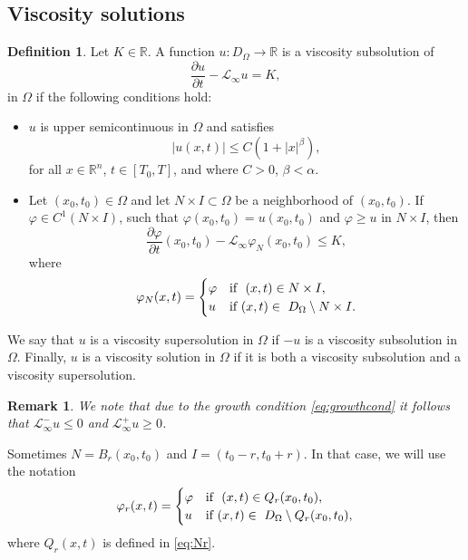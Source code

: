 \documentclass[11pt]{article}
\newcommand{\R}{\mathbb{R}}
\providecommand{\Linf}{\mathcal{L}_{\infty}}
\providecommand{\Lpos}{\mathcal{L}_{\infty}^+}
\providecommand{\Lneg}{\mathcal{L}_{\infty}^-}
\providecommand{\Rn}{\mathbb{R}^n}
\providecommand{\Ns}{N \times I}
\providecommand{\Rnp}{D_{\Omega}}
\newtheorem{rmk}[thm]{Remark}
\numberwithin{equation}{section}
\theoremstyle{definition}
\newtheorem{definition}[thm]{Definition}
\begin{document}
\subsection{Viscosity solutions}\label{sec:viscositysol}
\begin{definition}\label{def:viscsol}
    Let $K \in \R$. A function  $u: \Rnp \to \R$ is a viscosity subsolution of 
    \begin{equation}\label{eq:viscsol}
        \frac{\partial u}{\partial t}-\Linf u = K,
    \end{equation}
    in $\Omega$ if the following conditions hold:
    \begin{itemize}
        \item $u$ is upper semicontinuous in $\Omega$ and satisfies
    \begin{equation}\label{eq:growthcond}
          |u(x,t)| \leq C(1+|x|^{\beta}),  
    \end{equation}
         for all $x \in \Rn$, $t\in [T_0,T]$, and where $C> 0$, $\beta < \alpha$. 
        \item Let $(x_0,t_0) \in \Omega$ and let $\Ns \subset \Omega $ be a neighborhood of $(x_0,t_0)$. If $\varphi \in C^1(\Ns)$, such that $\varphi(x_0,t_0)=u(x_0,t_0)$ and $\varphi \geq u$ in $\Ns$, then
    $$
    \frac{\partial \varphi}{\partial t} \left(x_0,t_0\right)  - \mathcal{L}_{\infty}\varphi_{N}(x_0,t_0) \leq K, 
    $$
    where
\begin{align}\label{eq:varphiN}
     \varphi_{N}(x,t)= \begin{cases}
                      \varphi & \textup{if  } \ (x,t) \in \Ns,\\
                      u & \textup{if  } (x,t) \in \ \Rnp   \setminus \Ns.
            \end{cases}
 \end{align} 
\end{itemize}
We say that $u$ is a viscosity supersolution in $\Omega$ if $-u$ is a viscosity subsolution in $\Omega$. Finally, $u$ is a viscosity solution in $\Omega$ if it is both a viscosity subsolution and a viscosity supersolution.
\end{definition}
\begin{rmk}\label{rmk:posneg}
    We note that due to the growth condition \eqref{eq:growthcond} it follows that $\Lneg u \leq 0$ and $\Lpos u \geq 0$. 
\end{rmk}

Sometimes $N= B_r(x_0,t_0)$ and $I= (t_0-r, t_0+r)$. In that case, we will use the notation
\begin{align}\label{eq:defvarphir}
     \varphi_r(x,t)= \begin{cases}
                      \varphi & \textup{if  } \ (x,t) \in Q_r(x_0,t_0),\\
                      u & \textup{if  } (x,t) \in \ \Rnp   \setminus  Q_r(x_0,t_0),
            \end{cases}
 \end{align}
where $Q_r(x,t)$ is defined in \eqref{eq:Nr}.
\end{document}

